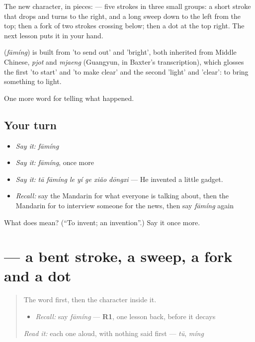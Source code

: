 The new character, in pieces:  — five strokes in three small groups: a short stroke that drops and turns to the right, and a long sweep down to the left from the top; then a fork of two strokes crossing below; then a dot at the top right. The next lesson puts it in your hand.

\begin{cousinweb}
\textbf{} (\emph{fāmíng}) is built from  'to send out' and  'bright', both inherited from Middle Chinese, \emph{pjot} and \emph{mjaeng} (Guangyun, in Baxter's transcription), which glosses the first 'to start' and 'to make clear' and the second 'light' and 'clear': to bring something to light.
\end{cousinweb}

\begin{grammarlens}[title={What you've built}]
One more word for telling what happened.
\end{grammarlens}

\subsection*{Your turn}
\begin{itemize}
\raggedright
  \item \emph{Say it:} \emph{fāmíng}
  \item \emph{Say it:} \emph{fāmíng}, once more
  \item \emph{Say it:} \emph{tā fāmíng le yí ge xiǎo dōngxi} — He invented a little gadget.
  \item \emph{Recall:} say the Mandarin for what everyone is talking about, then the Mandarin for to interview someone for the news, then say \emph{fāmíng} again
\end{itemize}

\begin{tcolorbox}[breakable,colback=teal!4,colframe=teal!35!black,title={Before you move on}]
What does  mean? (\textquotedblleft{}To invent; an invention\textquotedblright{}.) Say it once more.
\end{tcolorbox}
\section[\texorpdfstring{\zh{发} (fā)}{发 (fā)}]{ — a bent stroke, a sweep, a fork and a dot}

\label{lesson:ZH-W291-fa-send}



\begin{quote}
The word first, then the character inside it.

\begin{itemize}
\raggedright
  \item \emph{Recall:} say \emph{fāmíng} — \textbf{R1}, one lesson back, before it decays
\end{itemize}

\begin{quote}
 
\end{quote}

\emph{Read it:} each one aloud, with nothing said first — \emph{tū}, \emph{míng}
\end{quote}

